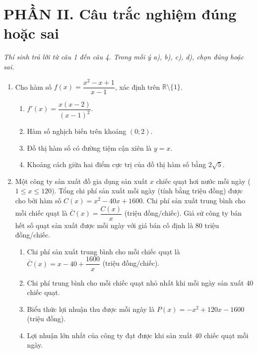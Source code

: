 \documentclass[12pt,a4paper]{article}
\begin{document}
\section*{\large PHẦN II. Câu trắc nghiệm đúng hoặc sai}
\textit{Thí sinh trả lời từ câu 1 đến câu 4. Trong mỗi ý a), b), c), d), chọn đúng hoặc sai.}
\begin{enumerate}
\item Cho hàm số $f(x)=\dfrac{x^2-x+1}{x-1}$, xác định trên $\mathbb R\setminus\{1\}$.
\begin{enumerate}
\item $f'(x)=\dfrac{x(x-2)}{(x-1)^2}$.
\item Hàm số nghịch biến trên khoảng $(0;2)$.
\item Đồ thị hàm số có đường tiệm cận xiên là $y=x$.
\item Khoảng cách giữa hai điểm cực trị của đồ thị hàm số bằng $2\sqrt5$.
\end{enumerate}

\item Một công ty sản xuất đồ gia dụng sản xuất $x$ chiếc quạt hơi nước mỗi ngày ($1\le x\le120$). Tổng chi phí sản xuất mỗi ngày (tính bằng triệu đồng) được cho bởi hàm số $C(x)=x^2-40x+1600$. Chi phí sản xuất trung bình cho mỗi chiếc quạt là $\bar C(x)=\dfrac{C(x)}{x}$ (triệu đồng/chiếc). Giả sử công ty bán hết số quạt sản xuất được mỗi ngày với giá bán cố định là $80$ triệu đồng/chiếc.
\begin{enumerate}
\item Chi phí sản xuất trung bình cho mỗi chiếc quạt là $\bar C(x)=x-40+\dfrac{1600}{x}$ (triệu đồng/chiếc).
\item Chi phí trung bình cho mỗi chiếc quạt nhỏ nhất khi mỗi ngày sản xuất $40$ chiếc quạt.
\item Biểu thức lợi nhuận thu được mỗi ngày là $P(x)=-x^2+120x-1600$ (triệu đồng).
\item Lợi nhuận lớn nhất của công ty đạt được khi sản xuất $40$ chiếc quạt mỗi ngày.
\end{enumerate}
\end{enumerate}
\end{document}
